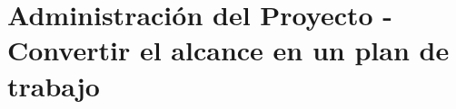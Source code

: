 \clearpage
\section{Administración del Proyecto - Convertir el alcance en un plan de trabajo}\label{sec:spmp-9}



